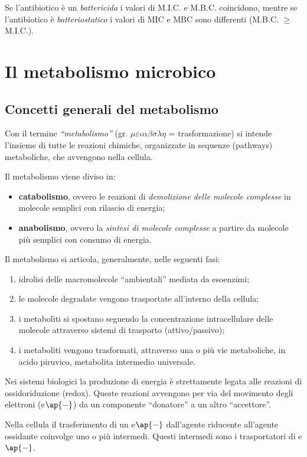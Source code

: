 \documentclass[11pt]{book}
\begin{document}
Se l’antibiotico è un \emph{battericida} i valori di M.I.C. e M.B.C. coincidono, mentre se l’antibiotico è \emph{batteriostatico} i valori di MIC e MBC sono differenti (M.B.C. $\ge$ M.I.C.).

\chapter{Il metabolismo microbico}
\section{Concetti generali del metabolismo}

Con il termine \emph{``metabolismo''} (gr. $\mu$$\varepsilon$$\iota$$\alpha$$\beta$$\sigma$$\lambda$$\eta$ = trasformazione) si intende l’insieme di tutte le reazioni chimiche, organizzate in sequenze (pathways) metaboliche, che avvengono nella cellula.

Il metabolismo viene diviso in:
\begin{itemize}
\item \textbf{catabolismo}, ovvero le reazioni di \emph{demolizione delle molecole complesse} in molecole semplici con rilascio di energia;
\item \textbf{anabolismo}, ovvero la \emph{sintesi di molecole complesse} a partire da molecole più semplici con consumo di energia.
\end{itemize}

Il metabolismo si articola, generalmente, nelle seguenti fasi: 
\begin{enumerate}
\item idrolisi delle macromolecole “ambientali” mediata da esoenzimi;
\item le molecole degradate vengono trasportate all’interno della cellula;
\item i metaboliti si spostano seguendo la concentrazione intracellulare delle molecole attraverso sistemi di trasporto (attivo/passivo);
\item i metaboliti vengono trasformati, attraverso una o più vie metaboliche, in acido piruvico, metabolita intermedio universale.
\end{enumerate}

Nei sistemi biologici la produzione di energia è strettamente legata alle reazioni di ossidoriduzione (redox). Queste reazioni avvengono per via del movimento degli elettroni (e$\ap{-}$) da un componente ``donatore'' a un altro ``accettore''. 

Nella cellula il trasferimento di un e$\ap{-}$ dall’agente riducente all’agente ossidante coinvolge uno o più intermedi. Questi intermedi sono i trasportatori di e$\ap{-}$.
\end{document}
